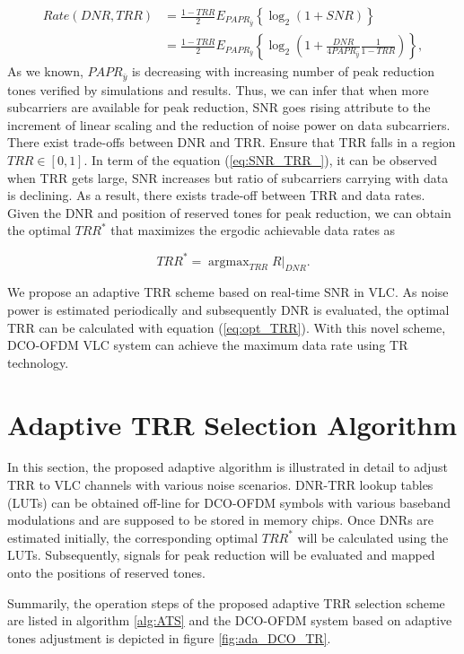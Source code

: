 \documentclass[9pt,twocolumn,twoside]{osajnl}
\begin{document}
\begin{align}
  Rate(DNR,TRR) & = \frac{1-TRR}{2} E_{PAPR_{\bar{y}}}{\left\{\log_2(1+SNR)\right\}} \\
  & = \frac{1-TRR}{2} E_{PAPR_{\bar{y}}}{\left\{\log_2(1+\frac{DNR}{4 PAPR_{\bar{y}}} \frac{1}{1-TRR})\right\}},
\end{align}
As we known, $PAPR_{\bar{y}}$ is decreasing with increasing number of peak reduction tones 
verified by simulations and results. Thus, we can infer that when more subcarriers are available for peak reduction, SNR goes rising 
attribute to the increment of linear scaling and the reduction of noise power on data subcarriers. There exist trade-offs between DNR and TRR. Ensure that TRR falls in a region 
$TRR \in [0,1]$. In term of the equation (\ref{eq:SNR_TRR_}), it can be observed when TRR gets large, SNR increases but ratio of subcarriers carrying with data is declining. 
As a result, there exists trade-off between TRR and data rates. Given the DNR and position of reserved tones 
for peak reduction, we can obtain the optimal $TRR^*$ that maximizes the ergodic achievable data rates as 

\begin{equation}
  TRR^* = \mathop{\arg\max}_{TRR} R|_{DNR}.
  \label{eq:opt_TRR}
\end{equation}

We propose an adaptive TRR scheme based on real-time SNR in VLC. As noise power is estimated periodically and subsequently DNR is evaluated, the optimal TRR can be calculated with equation (\ref{eq:opt_TRR}). 
With this novel scheme, DCO-OFDM VLC system can achieve the maximum data rate using TR technology.

\section{Adaptive TRR Selection Algorithm}

In this section, the proposed adaptive algorithm is illustrated in detail to adjust TRR to VLC channels with various noise scenarios. DNR-TRR lookup tables (LUTs) can be obtained off-line for DCO-OFDM symbols 
with various baseband modulations and are supposed to be stored in memory chips. Once DNRs are estimated initially, the corresponding optimal $TRR^*$ will be calculated using the LUTs. 
Subsequently, signals for peak reduction will be evaluated and mapped onto the positions of reserved tones.

Summarily, the operation steps of the proposed adaptive TRR selection scheme are listed in algorithm \ref{alg:ATS} and the DCO-OFDM system based on adaptive tones adjustment is 
depicted in figure \ref{fig:ada_DCO_TR}.
\end{document}

